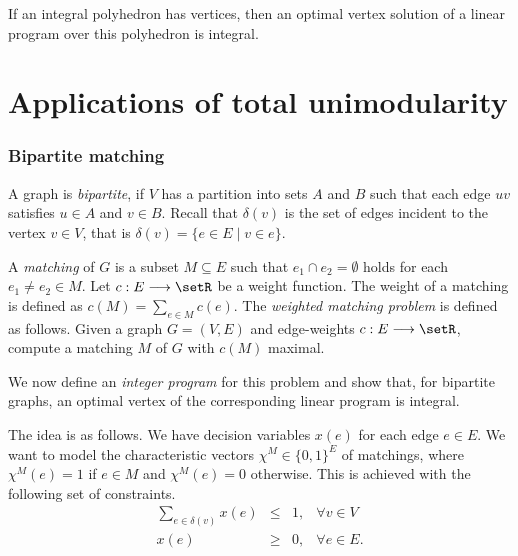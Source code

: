 If an integral polyhedron has vertices, then an optimal vertex
solution of a  linear program over this polyhedron is integral.  

\section{Applications of total unimodularity}

\subsubsection{Bipartite matching} 


A graph is
\emph{bipartite}, if $V$ has a partition into sets $A$ and $B$ such
that each  edge $uv$ satisfies $u\in A$ and $v \in B$.
Recall that $\delta(v)$ is the set of edges incident to the vertex $v\in V$,
that is $\delta(v) = \{ e\in E \mid v\in e \}$.

A \emph{matching} of $G$ is a subset $M\subseteq E$ such that $e_1\cap e_2 = \emptyset$
holds for each $e_1\neq e_2\in M$. Let $c:E\longrightarrow\setR$ be a weight function. The
weight of a matching is defined as $c(M) = \sum_{e \in M}c(e)$.  The
\emph{weighted matching problem } is  defined as follows. Given a
graph $G = (V,E)$ and edge-weights $c:E\longrightarrow\setR$, compute a matching $M$
of $G$ with $c(M)$ maximal.


We now define
an \emph{integer program} for this problem and show that, for
bipartite graphs, an optimal vertex of the corresponding linear
program is integral. 


The idea is as follows. We have decision variables $x(e)$ for each
edge $e \in E$. We want to model the characteristic vectors $\chi^M\in
\{0,1\}^E$  of matchings, where $\chi^M(e)=1$ if  $e\in M$  and $\chi^M(e)=0$
otherwise. This is achieved with the following set of constraints. 
\begin{equation}
  \label{po:eq:3}
  \begin{array}{rcll}
    \sum_{e \in \delta(v)} x(e) &\leq&1, & \forall v \in V \\
    x(e) &\geq&0, & \forall e \in E. 
  \end{array}
\end{equation}

